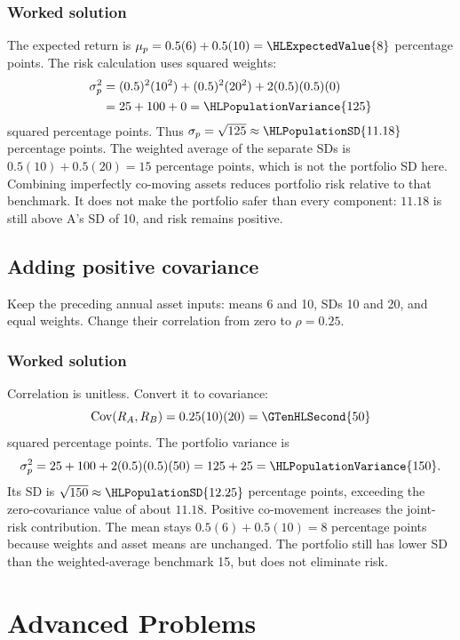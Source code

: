 \subsubsection*{Worked solution}\label{sol:sec:general-worked1}
The expected return is $\mu_p=0.5(6)+0.5(10)=\HLExpectedValue{8}$ percentage points. The risk calculation uses squared weights:
\[
\begin{aligned}
\sigma_p^2
&=(0.5)^2(10^2)+(0.5)^2(20^2)+2(0.5)(0.5)(0)\\
&=25+100+0=\HLPopulationVariance{125}
\end{aligned}
\]
squared percentage points. Thus $\sigma_p=\sqrt{125}\approx\HLPopulationSD{11.18}$ percentage points.
The weighted average of the separate SDs is $0.5(10)+0.5(20)=15$ percentage points, which is not the portfolio SD here. Combining imperfectly co-moving assets reduces portfolio risk relative to that benchmark. It does not make the portfolio safer than every component: $11.18$ is still above A's SD of 10, and risk remains positive.


\subsection{Adding positive covariance}\label{prob:sec:general-worked2}
Keep the preceding annual asset inputs: means 6 and 10, SDs 10 and 20, and equal weights. Change their correlation from zero to $\rho=0.25$.
\subsubsection*{Worked solution}\label{sol:sec:general-worked2}
Correlation is unitless. Convert it to covariance:
\[
\operatorname{Cov}(R_A,R_B)=0.25(10)(20)=\GTenHLSecond{50}
\]
squared percentage points. The portfolio variance is
\[
\sigma_p^2=25+100+2(0.5)(0.5)(50)
=125+25=\HLPopulationVariance{150}.
\]
Its SD is $\sqrt{150}\approx\HLPopulationSD{12.25}$ percentage points, exceeding the zero-covariance value of about $11.18$. Positive co-movement increases the joint-risk contribution. The mean stays $0.5(6)+0.5(10)=8$ percentage points because weights and asset means are unchanged. The portfolio still has lower SD than the weighted-average benchmark 15, but does not eliminate risk.
\section{Advanced Problems}\label{sec:advanced}

